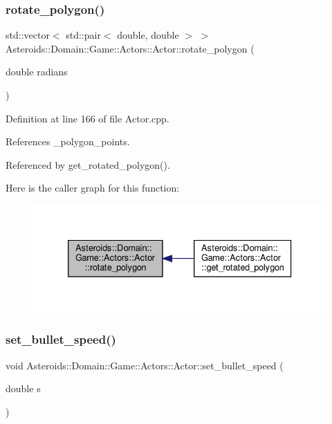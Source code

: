 \subsubsection{\texorpdfstring{rotate\+\_\+polygon()}{rotate\_polygon()}}
{\footnotesize\ttfamily std\+::vector$<$ std\+::pair$<$ double, double $>$ $>$ Asteroids\+::\+Domain\+::\+Game\+::\+Actors\+::\+Actor\+::rotate\+\_\+polygon (\begin{DoxyParamCaption}\item[{double}]{radians }\end{DoxyParamCaption})}



Definition at line 166 of file Actor.\+cpp.



References \+\_\+polygon\+\_\+points.



Referenced by get\+\_\+rotated\+\_\+polygon().

Here is the caller graph for this function\+:\nopagebreak
\begin{figure}[H]
\begin{center}
\leavevmode
\includegraphics[width=333pt]{classAsteroids_1_1Domain_1_1Game_1_1Actors_1_1Actor_a5079dbc947f23a828180242b0ff49f33_icgraph}
\end{center}
\end{figure}
\mbox{\label{classAsteroids_1_1Domain_1_1Game_1_1Actors_1_1Actor_a4dddef94a025aca35e8592aa3aac71e5}} 
\subsubsection{\texorpdfstring{set\+\_\+bullet\+\_\+speed()}{set\_bullet\_speed()}}
{\footnotesize\ttfamily void Asteroids\+::\+Domain\+::\+Game\+::\+Actors\+::\+Actor\+::set\+\_\+bullet\+\_\+speed (\begin{DoxyParamCaption}\item[{double}]{s }\end{DoxyParamCaption})\hspace{0.3cm}{\ttfamily [protected]}}



